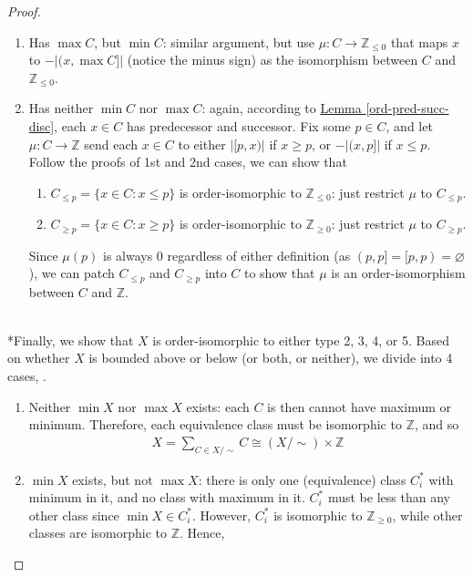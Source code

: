 \documentclass{treatise}
\begin{document}
\begin{proof}
\begin{enumerate}
\begin{enumerate}
        \item Finally, $\mu$ is order-preserving (thus, an order-isomorphism): this is in the proof of injection.
    \end{enumerate}
    We conclude $C$ is isomorphic to $\mathbb{Z}_{\geq 0}$.
    \item Has $\max C$, but $\min C$: similar argument, but use $\mu: C \to \mathbb{Z}_{\leq 0}$ that maps $x$ to $-|(x, \max C]|$ (notice the minus sign) as the isomorphism between $C$ and $\mathbb{Z}_{\leq 0}$.
    \item Has neither $\min C$ nor $\max C$: again, according to \hyperref[ord-pred-succ-disc]{Lemma \ref*{ord-pred-succ-disc}}, each $x \in C$ has predecessor and successor. Fix some $p \in C$, and let $\mu: C \to \mathbb{Z}$ send each $x \in C$ to either $|[p, x)|$ if $x \geq p$, or $-|(x, p]|$ if $x \leq p$. Follow the proofs of 1st and 2nd cases, we can show that
    \begin{enumerate}
        \item $C_{\leq p} = \{ x \in C : x \leq p \}$ is order-isomorphic to $\mathbb{Z}_{\leq 0}$: just restrict $\mu$ to $C_{\leq p}$.
        \item $C_{\geq p} = \{ x \in C : x \geq p \}$ is order-isomorphic to $\mathbb{Z}_{\geq 0}$: just restrict $\mu$ to $C_{\geq p}$.
    \end{enumerate}
    Since $\mu(p)$ is always $0$ regardless of either definition (as $(p, p] = [p, p) = \varnothing$), we can patch $C_{\leq p}$ and $C_{\geq p}$ into $C$ to show that $\mu$ is an order-isomorphism between $C$ and $\mathbb{Z}$.
\end{enumerate}
\ \\
*Finally, we show that $X$ is order-isomorphic to either type 2, 3, 4, or 5. Based on whether $X$ is bounded above or below (or both, or neither), we divide into 4 cases, .
\begin{enumerate}
    \item Neither $\min X$ nor $\max X$ exists: each $C$ is then cannot have maximum or minimum. Therefore, each equivalence class must be isomorphic to $\mathbb{Z}$, and so
    \begin{align*}
        X = \sum_{C \in X / \sim} C \cong (X / \sim) \times \mathbb{Z}
    \end{align*}
    \item $\min X$ exists, but not $\max X$: there is only one (equivalence) class $C_i^*$ with minimum in it, and no class with maximum in it. $C_i^*$ must be less than any other class since $\min X \in C_i^*$. However, $C_i^*$ is isomorphic to $\mathbb{Z}_{\geq 0}$, while other classes are isomorphic to $\mathbb{Z}$. Hence, 

\end{enumerate}
\end{proof}
\end{document}
